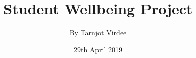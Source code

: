 \documentclass[a4paper, 12pt]{article}
\begin{document}
\title{\Large{\textbf{Student Wellbeing Project}}}
\author{By Tarnjot Virdee}
\date{29th April 2019}

\maketitle

\newpage














\end{document}
